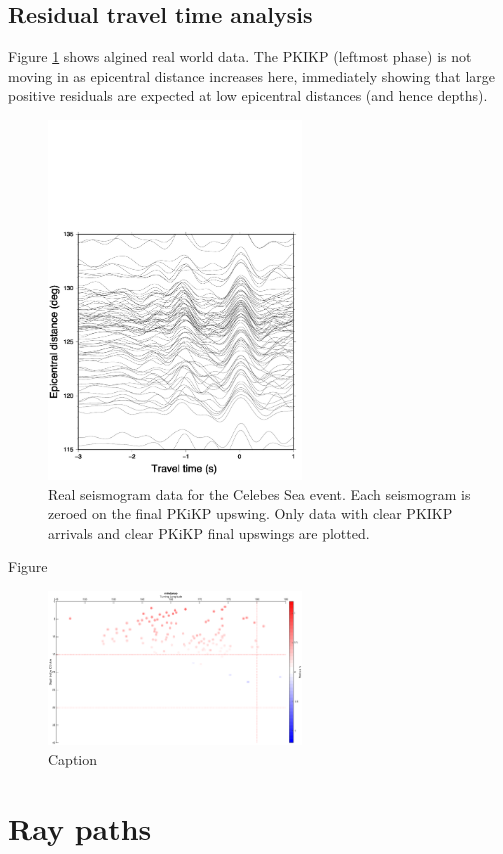 \documentclass[11pt,a4paper]{article}
\begin{document}
\subsection{Residual travel time analysis}
Figure \ref{fig:Real aligned} shows algined real world data. The PKIKP (leftmost phase) is not moving in as epicentral distance increases here, immediately showing that large positive residuals are expected at low epicentral distances (and hence depths).

\begin{figure}
	\centering
	\includegraphics[width=0.6\textwidth]{figures/celebessea/celebessea_real_aligned.pdf}
	\caption{Real seismogram data for the Celebes Sea event. Each seismogram is zeroed on the final PKiKP upswing. Only data with clear PKIKP arrivals and clear PKiKP final upswings are plotted.}
	\label{fig:Real aligned}
\end{figure}

Figure 
\begin{figure}
	\centering
	\includegraphics[width=0.6\textwidth]{figures/mindanao/mindanao_longitude}
	\caption{Caption}
\end{figure}


\appendix
\section{Ray paths}
\newpage


\end{document}
